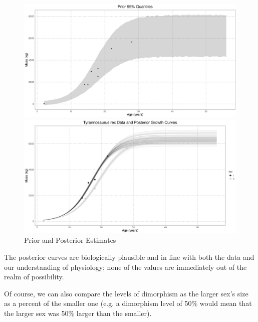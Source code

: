 \documentclass[letterpaper]{article}
\begin{document}
\begin{figure}[H]
  \centering
  \begin{minipage}[b]{0.45\textwidth}
    \centering
    \includegraphics[width=\textwidth]{images/tyrannosaurPrior.png}
  \end{minipage}
  \begin{minipage}[b]{0.45\textwidth}
    \centering
    \includegraphics[width=\textwidth]{images/tyrannosaurPosterior.png}
  \end{minipage}
    \label{fig:tyrannosaurPriorPosterior}
    \caption{\tyran{} Prior and Posterior Estimates}
\end{figure} 

The posterior curves are biologically plausible and in line with both the data and our understanding of physiology; none of the values are immediately out of the realm of possibility.

Of course, we can also compare the levels of dimorphism as the larger sex's size as a percent of the smaller one (e.g. a dimorphism level of 50\% would mean that the larger sex was 50\% larger than the smaller).
\end{document}
